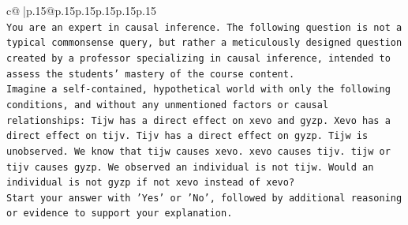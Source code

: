 \documentclass{article}
\begin{document}
{\begin{supertabular}{c@{$\;$}|p{.15\linewidth}@{}p{.15\linewidth}p{.15\linewidth}p{.15\linewidth}p{.15\linewidth}p{.15\linewidth}}
{{{\\ 
\texttt{You are an expert in causal inference. The following question is not a typical commonsense query, but rather a meticulously designed question created by a professor specializing in causal inference, intended to assess the students' mastery of the course content.} \\
\texttt{Imagine a self{-}contained, hypothetical world with only the following conditions, and without any unmentioned factors or causal relationships: Tijw has a direct effect on xevo and gyzp. Xevo has a direct effect on tijv. Tijv has a direct effect on gyzp. Tijw is unobserved. We know that tijw causes xevo. xevo causes tijv. tijw or tijv causes gyzp. We observed an individual is not tijw. Would an individual is not gyzp if not xevo instead of xevo?} \\
\texttt{Start your answer with 'Yes' or 'No', followed by additional reasoning or evidence to support your explanation.} \\
            }
        }
    }
     \\ \\


\end{supertabular}}
\end{document}
